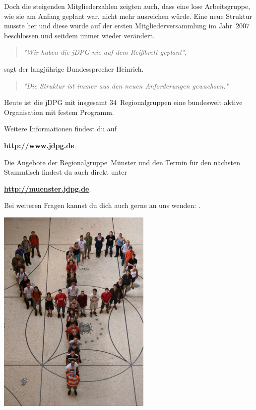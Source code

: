 \begin{multicols}{2}
Doch die steigenden Mitgliederzahlen zeigten auch, dass eine lose Arbeitsgruppe, wie sie am Anfang geplant war, nicht mehr ausreichen würde.
Eine neue Struktur musste her und diese wurde auf der ersten Mitgliederversammlung im Jahr~2007 beschlossen und seitdem immer wieder verändert.
\begin{quote}
    \textit{"Wir haben die jDPG nie auf dem Reißbrett geplant"},
\end{quote}
sagt der langjährige Bundessprecher Heinrich.
\begin{quote}
    \textit{"Die Struktur ist immer aus den neuen Anforderungen gewachsen."}
\end{quote}

Heute ist die jDPG mit insgesamt 34~Regionalgruppen eine bundesweit aktive Organisation mit festem Programm.

Weitere Informationen findest du auf
\begin{center}
    \textbf{\url{http://www.jdpg.de}}.
\end{center}

Die Angebote der Regionalgruppe~Münster und den Termin für den nächsten Stammtisch findest du auch direkt unter
\begin{center}
    \textbf{\url{http://muenster.jdpg.de}}.
\end{center}

Bei weiteren Fragen kannst du dich auch gerne an uns wenden:
\textbf{}.

\begin{center}
    \includegraphics[width=\columnwidth]{res/jdpg_foto.png}
\end{center}


\end{multicols}
